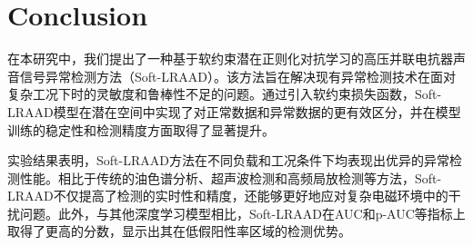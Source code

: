\documentclass{article}
\begin{document}
\section{Conclusion}

在本研究中，我们提出了一种基于软约束潜在正则化对抗学习的高压并联电抗器声音信号异常检测方法（Soft-LRAAD）。该方法旨在解决现有异常检测技术在面对复杂工况下时的灵敏度和鲁棒性不足的问题。通过引入软约束损失函数，Soft-LRAAD模型在潜在空间中实现了对正常数据和异常数据的更有效区分，并在模型训练的稳定性和检测精度方面取得了显著提升。

实验结果表明，Soft-LRAAD方法在不同负载和工况条件下均表现出优异的异常检测性能。相比于传统的油色谱分析、超声波检测和高频局放检测等方法，Soft-LRAAD不仅提高了检测的实时性和精度，还能够更好地应对复杂电磁环境中的干扰问题。此外，与其他深度学习模型相比，Soft-LRAAD在AUC和p-AUC等指标上取得了更高的分数，显示出其在低假阳性率区域的检测优势。


\end{document}
